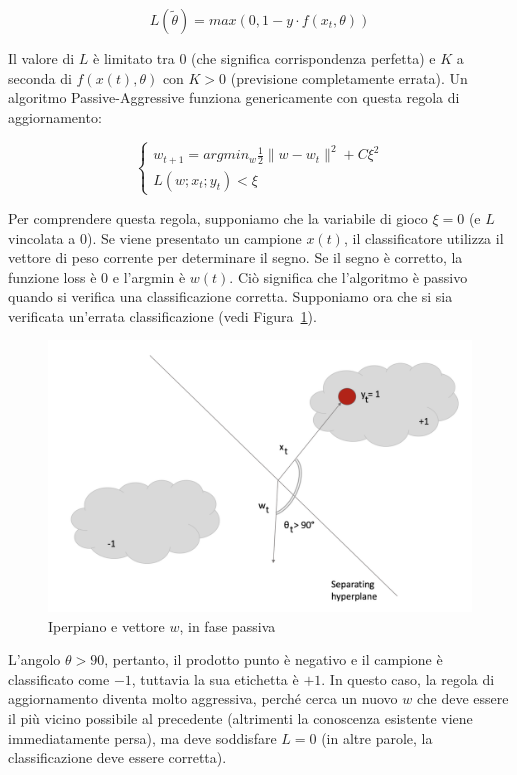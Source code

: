 $$L(\tilde{\theta})=max(0,1-y\cdot f(x_t,\theta))$$

Il valore di $L$ è limitato tra $0$ (che significa corrispondenza perfetta) e $K$ a seconda di $f(x(t), \theta)$ con $K > 0$ (previsione completamente errata). Un algoritmo Passive-Aggressive funziona genericamente con questa regola di aggiornamento:

$$\left\{
                \begin{array}{ll}
                  w_{t+1}=argmin_w\frac{1}{2}\| w-w_t\|^2 +C\xi^2\\
                  L(w;x_t;y_t) < \xi
                \end{array}
              \right.$$
              
Per comprendere questa regola, supponiamo che la variabile di gioco $\xi = 0$ (e $L$ vincolata a $0$). Se viene presentato un campione $x(t)$, il classificatore utilizza il vettore di peso corrente per determinare il segno. Se il segno è corretto, la funzione loss è $0$ e l'argmin è $w(t)$. Ciò significa che l'algoritmo è passivo quando si verifica una classificazione corretta. Supponiamo ora che si sia verificata un'errata classificazione (vedi Figura~\ref{fig:PAII1}).            
              
\begin{figure}[h]
    \centering
    \includegraphics[scale=0.5]{Figure/PAII1.png}
    \caption{Iperpiano e vettore $w$, in fase passiva}
    \label{fig:PAII1}
\end{figure}
\FloatBarrier  

L'angolo $\theta> 90$, pertanto, il prodotto punto è negativo e il campione è classificato come $-1$, tuttavia la sua etichetta è $+1$. In questo caso, la regola di aggiornamento diventa molto aggressiva, perché cerca un nuovo $w$ che deve essere il più vicino possibile al precedente (altrimenti la conoscenza esistente viene immediatamente persa), ma deve soddisfare $L = 0$ (in altre parole, la classificazione deve essere corretta).

